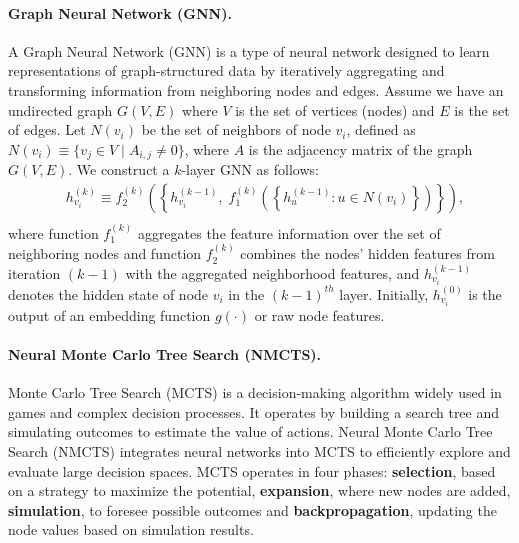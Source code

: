 \documentclass[letterpaper]{article} %
\begin{document}
\paragraph{Graph Neural Network (GNN).} A Graph Neural Network (GNN) is a type of neural network designed to learn representations of graph-structured data by iteratively aggregating and transforming information from neighboring nodes and edges. Assume we have an undirected graph $G (V, E)$ where $V$ is the set of vertices (nodes) and $E$ is the set of edges. 
Let \( N(v_i) \) be the set of neighbors of node \( v_i \), defined as \( N(v_i) \equiv \{ v_j \in V \mid A_{i,j} \neq 0 \} \), where \( A \) is the adjacency matrix of the graph $G (V, E)$.
	We construct a $k$-layer GNN as follows:
	\begin{equation*}
		\begin{aligned}
			& h_{v_i}^{\left(k\right)} \equiv  f^{\left(k\right)}_{2}\left(\left\{h_{v_i}^{\left(k-1\right)},\;f^{\left(k\right)}_{1}\left(\left\{h_{u}^{\left(k-1\right)}:u \in N\left(v_i\right)\right\}\right)\right\}\right),\\
		\end{aligned}
	\end{equation*}
	where function $f^{\left(k\right)}_1$ aggregates the feature information over the set of neighboring nodes and function $f^{\left(k\right)}_2$ combines the nodes’ hidden features from iteration $\left(k-1\right)$ with the aggregated neighborhood features, and $h_{v_i}^{\left(k-1\right)}$ denotes the hidden state of node $v_i$ in the $\left(k-1\right)^{th}$ layer. 
    Initially, $h_{v_i}^{\left(0\right)}$ is the output of an embedding function $g\left(\cdot\right)$ or raw node features.


\paragraph{Neural Monte Carlo Tree Search (NMCTS).} Monte Carlo Tree Search (MCTS) is a decision-making algorithm widely used in games and complex decision processes. It operates by building a search tree and simulating outcomes to estimate the value of actions. Neural Monte Carlo Tree Search (NMCTS) integrates neural networks into MCTS to efficiently explore and evaluate large decision spaces. MCTS operates in four phases: \textbf{selection}, based
on a strategy to maximize the potential, \textbf{expansion}, where new nodes are added, \textbf{simulation}, to foresee possible outcomes and \textbf{backpropagation}, updating the node values based on simulation
results.
\end{document}
